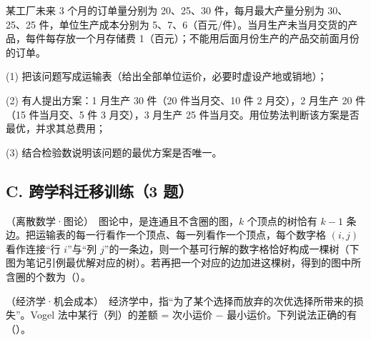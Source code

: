  某工厂未来 3 个月的订单量分别为 20、25、30 件，每月最大产量分别为 30、25、25 件，单位生产成本分别为 5、7、6（百元/件）。当月生产未当月交货的产品，每件每存放一个月存储费 1（百元）；不能用后面月份生产的产品交前面月份的订单。\par\noindent(1) 把该问题写成运输表（给出全部单位运价，必要时虚设产地或销地）；\par\noindent(2) 有人提出方案：1 月生产 30 件（20 件当月交、10 件 2 月交），2 月生产 20 件（15 件当月交、5 件 3 月交），3 月生产 25 件当月交。用位势法判断该方案是否最优，并求其总费用；\par\noindent(3) 结合检验数说明该问题的最优方案是否唯一。

\subsection*{C. 跨学科迁移训练（3 题）}
 （离散数学·图论）\ 图论中，是连通且不含圈的图，$k$ 个顶点的树恰有 $k-1$ 条边。把运输表的每一行看作一个顶点、每一列看作一个顶点，每个数字格 $(i,j)$ 看作连接“行 $i$”与“列 $j$”的一条边，则一个基可行解的数字格恰好构成一棵树（下图为笔记引例最优解对应的树）。若再把一个对应的边加进这棵树，得到的图中所含圈的个数为（\quad）。
\par\noindent\begin{minipage}{0.45\linewidth}\end{minipage}\hfill\begin{minipage}{0.52\linewidth}\centering
{}\end{minipage}

 （经济学·机会成本）\ 经济学中，指“为了某个选择而放弃的次优选择所带来的损失”。Vogel 法中某行（列）的差额 = 次小运价 $-$ 最小运价。下列说法正确的有（\quad）。

